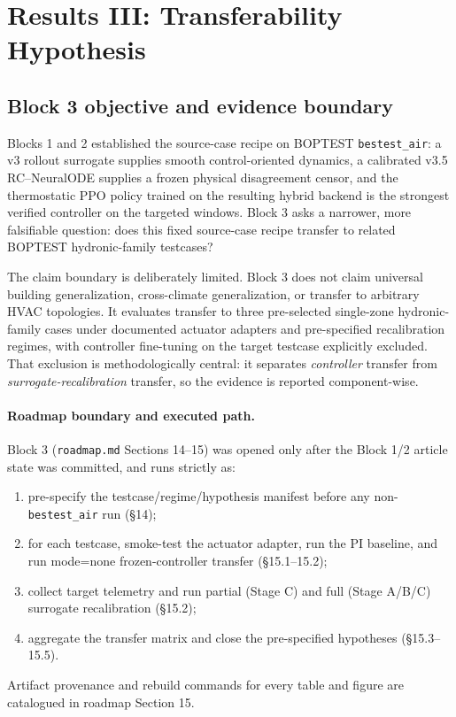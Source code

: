 \documentclass[11pt,a4paper]{article}
\begin{document}
\setcounter{section}{5}
\section{Results III: Transferability Hypothesis}
\label{sec:results3-transfer}

\subsection{Block 3 objective and evidence boundary}

Blocks 1 and 2 established the source-case recipe on BOPTEST \texttt{bestest\_air}: a v3 rollout surrogate supplies smooth control-oriented dynamics, a calibrated v3.5 RC--NeuralODE supplies a frozen physical disagreement censor, and the thermostatic PPO policy trained on the resulting hybrid backend is the strongest verified controller on the targeted windows. Block 3 asks a narrower, more falsifiable question: does this fixed source-case recipe transfer to related BOPTEST hydronic-family testcases?

The claim boundary is deliberately limited. Block 3 does not claim universal building generalization, cross-climate generalization, or transfer to arbitrary HVAC topologies. It evaluates transfer to three pre-selected single-zone hydronic-family cases under documented actuator adapters and pre-specified recalibration regimes, with controller fine-tuning on the target testcase explicitly excluded. That exclusion is methodologically central: it separates \emph{controller} transfer from \emph{surrogate-recalibration} transfer, so the evidence is reported component-wise.

\paragraph{Roadmap boundary and executed path.}
Block 3 (\texttt{roadmap.md} Sections 14--15) was opened only after the Block 1/2 article state was committed, and runs strictly as:
\begin{enumerate}
  \item pre-specify the testcase/regime/hypothesis manifest before any non-\texttt{bestest\_air} run (\S14);
  \item for each testcase, smoke-test the actuator adapter, run the PI baseline, and run mode=none frozen-controller transfer (\S15.1--15.2);
  \item collect target telemetry and run partial (Stage C) and full (Stage A/B/C) surrogate recalibration (\S15.2);
  \item aggregate the transfer matrix and close the pre-specified hypotheses (\S15.3--15.5).
\end{enumerate}
Artifact provenance and rebuild commands for every table and figure are catalogued in roadmap Section 15.
\end{document}
